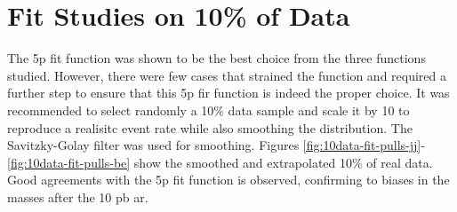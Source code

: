 \newpage

\vspace*{0.5in}

\section{Fit Studies on 10\% of Data}
\label{appendix:10data-fit-studies}
\setcounter{equation}{0}

The 5p fit function was shown to be the best choice from the three functions studied. However, there were few cases that strained the function and required a further step 
to ensure that this 5p fir function is indeed the proper choice. It was recommended to select randomly a 10\% data sample and scale it by 10 to reproduce a realisitc 
event rate while also smoothing the distribution. The Savitzky-Golay filter \cite{smoothing} was used for smoothing. Figures \ref{fig:10data-fit-pulls-jj}-\ref{fig:10data-fit-pulls-be} show the smoothed and extrapolated 10\% of real data. 
Good agreements with the 5p fit function is observed, confirming to biases in the masses after the 10 pb \gls{ar}. 

\newpage


